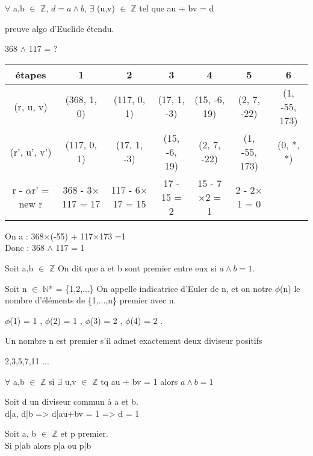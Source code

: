 \begin{prop}
	$\forall$ a,b $\in$ $\mathbb{Z}$, $d = a \wedge b$,
	$\exists$ (u,v) $\in$ $\mathbb{Z}$ tel que au + bv = d 
\end{prop}
\begin{dem}
	preuve algo d'Euclide étendu.
\end{dem}
\begin{ex}
	368 $\wedge$ 117 = ? \\
	\begin{tabular}{|c||c|c|c|c|c|c|}
		\hline
		étapes & 1 & 2 & 3 & 4 & 5 & 6\\
		\hline
		(r, u, v) & (368, 1, 0) & (117, 0, 1) & (17, 1, -3) & (15, -6, 19) & (2, 7, -22) & (1, -55, 173) \\ 
		\hline
		(r', u', v') & (117, 0, 1) & (17, 1, -3) & (15, -6, 19) & (2, 7, -22) & (1, -55, 173) & (0, *, *) \\ 
		\hline
		r - $\alpha$r' = new r & 368 - 3$\times$117 = 17 & 117 - 6$\times$17 = 15 & 17 - 15 = 2 & 15 - 7$\times$2 = 1 & 2 - 2$\times$1 = 0 &\\
		\hline
	\end{tabular}
	On a : 368$\times$(-55) + 117$\times$173 =1\\
	Donc : 368 $\wedge$ 117 = 1
\end{ex}
\begin{defi}
	Soit a,b $\in$ $\mathbb{Z}$ On dit que a et b sont premier entre eux si $a \wedge b = 1$.
\end{defi}
\begin{defi}
	Soit n $\in$ $\mathbb{N}$* = \{1,2,...\}
	On appelle indicatrice d'Euler de n, et on notre $\phi$(n) le nombre d'éléments de \{1,...,n\} premier avec n.
\end{defi}
\begin{ex}
	$\phi$(1) = 1 , 
	$\phi$(2) = 1 , 
	$\phi$(3) = 2 , 
	$\phi$(4) = 2 .
\end{ex}
\begin{defi}
	Un nombre n est premier s'il admet exactement deux diviseur positifs
\end{defi} 
\begin{ex}
	2,3,5,7,11 ...
\end{ex} 
\begin{thm}[Bézout]
	$\forall$ a,b $\in$ $\mathbb{Z}$ si $\exists$ u,v $\in$ $\mathbb{Z}$ tq au + bv = 1 alors $a \wedge b = 1$
\end{thm}
\begin{dem}
	Soit d un diviseur commun à a et b.\\
	d|a, d|b => d|au+bv = 1 => d = 1
\end{dem}
\begin{lem}
	Soit a, b $\in$ $\mathbb{Z}$ et p premier.\\
	Si p|ab alors p|a ou p|b
\end{lem}

